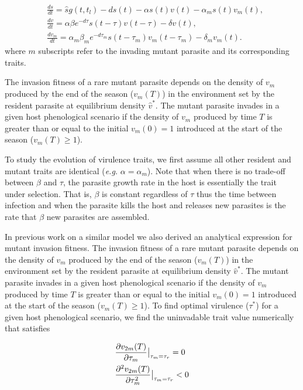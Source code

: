 \documentclass{article}
\begin{document}
\begin{align*}
&\frac{ds}{dt} = \hat{s}g(t,t_{l})- d s(t)- \alpha s(t)v(t) - \alpha_{m} s(t)v_{m}(t),\tag{2a}\\
&\frac{dv}{dt} = \alpha \beta e^{-d\tau} s(t-\tau)v(t-\tau)-\delta v(t),\tag{2b}\\
&\frac{dv_{m}}{dt} = \alpha_{m} \beta_{m} e^{-d\tau_{m}} s(t-\tau_{m})v_{m}(t-\tau_{m})-\delta_{m} v_{m}(t).\tag{2c}
\end{align*}
where $m$ subscripts refer to the invading mutant parasite and its corresponding traits.

The invasion fitness of a rare mutant parasite depends on the density of $v_{m}$ produced by the end of the season ($v_{m}(T)$) in the environment set by the resident parasite at equilibrium density $\hat{v}^*$. The mutant parasite invades in a given host phenological scenario if the density of $v_{m}$ produced by time $T$ is greater than or equal to the initial $v_{m}(0) = 1$ introduced at the start of the season ($v_{m}(T) \geq 1$).

To study the evolution of virulence traits, we first assume all other resident and mutant traits are identical (\textit{e.g.} $\alpha=\alpha_{m}$). Note that when there is no trade-off between $\beta$ and $\tau$, the parasite growth rate in the host is essentially the trait under selection. That is, $\beta$ is constant regardless of $\tau$ thus the time between infection and when the parasite kills the host and releases new parasites is the rate that $\beta$ new parasites are assembled.

In previous work on a similar model we also derived an analytical expression for mutant invasion fitness\cite{macdonald2021host}. The invasion fitness of a rare mutant parasite depends on the density of $v_{m}$ produced by the end of the season ($v_{m}(T)$) in the environment set by the resident parasite at equilibrium density $\hat{v}^*$. The mutant parasite invades in a given host phenological scenario if the density of $v_{m}$ produced by time $T$ is greater than or equal to the initial $v_{m}(0) = 1$ introduced at the start of the season ($v_{m}(T) \geq 1$). To find optimal virulence ($\tau^*$) for a given host phenological scenario, we find the uninvadable trait value numerically that satisfies

\begin{align*}
  &\evalat{\frac{\partial v_{2m}(T)}{\partial\tau_{m}}}{\tau_{m}=\tau_{r}}=0\\
  &\evalat{\frac{\partial^2v_{2m}(T)}{\partial\tau_{m}^2}}{\tau_{m}=\tau_{r}}<0
\end{align*}
\end{document}

